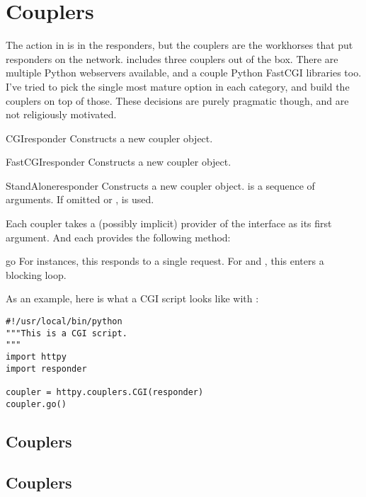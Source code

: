 \section{Couplers \label{couplers}}

The action in  is in the responders, but the couplers are the
workhorses that put responders on the network.  includes three
couplers out of the box. There are multiple Python webservers available, and a
couple Python FastCGI libraries too. I've tried to pick the single most mature
option in each category, and build the couplers on top of those. These decisions
are purely pragmatic though, and are not religiously motivated.

\begin{classdesc}{CGI}{responder} Constructs a new  coupler object.
\end{classdesc}

\begin{classdesc}{FastCGI}{responder} Constructs a new  coupler
object.
\end{classdesc}

\begin{classdesc}{StandAlone}{responder} Constructs a new
 coupler object.  is a sequence of arguments. If
omitted or ,  is used. \end{classdesc}

Each coupler takes a (possibly implicit) provider of the 
interface as its first argument. And each provides the following method:

\begin{methoddesc}{go}{} For  instances, this responds to a single
request. For  and , this enters a blocking
loop.\end{methoddesc}

As an example, here is what a CGI script looks like with :

\begin{verbatim}
#!/usr/local/bin/python
"""This is a CGI script.
"""
import httpy
import responder

coupler = httpy.couplers.CGI(responder)
coupler.go()
\end{verbatim}



\subsection{ Couplers \label{cgi}}
\subsection{ Couplers \label{standalone}}
